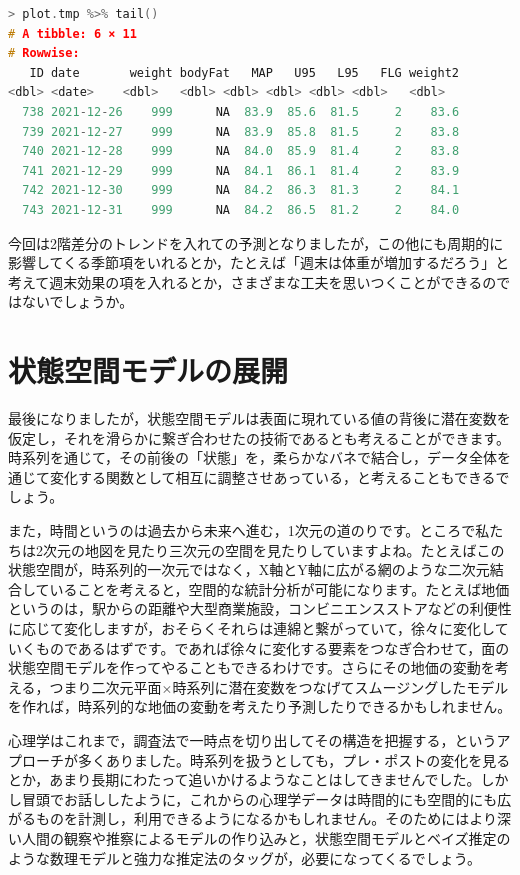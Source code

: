 \documentclass{ltjsbook}
\begin{document}
\begin{lstlisting}[language=c++,label={code:29_06},caption={2階差分トレンドで予想される2021年末の体重(一部略)}]
> plot.tmp %>% tail()
# A tibble: 6 × 11
# Rowwise: 
   ID date       weight bodyFat   MAP   U95   L95   FLG weight2
<dbl> <date>    <dbl>   <dbl> <dbl> <dbl> <dbl> <dbl>   <dbl>
  738 2021-12-26    999      NA  83.9  85.6  81.5     2    83.6
  739 2021-12-27    999      NA  83.9  85.8  81.5     2    83.8
  740 2021-12-28    999      NA  84.0  85.9  81.4     2    83.8
  741 2021-12-29    999      NA  84.1  86.1  81.4     2    83.9
  742 2021-12-30    999      NA  84.2  86.3  81.3     2    84.1
  743 2021-12-31    999      NA  84.2  86.5  81.2     2    84.0
\end{lstlisting}

今回は2階差分のトレンドを入れての予測となりましたが，この他にも周期的に影響してくる季節項をいれるとか，たとえば「週末は体重が増加するだろう」と考えて週末効果の項を入れるとか，さまざまな工夫を思いつくことができるのではないでしょうか。

\section{状態空間モデルの展開}
最後になりましたが，状態空間モデルは表面に現れている値の背後に潜在変数を仮定し，それを滑らかに繋ぎ合わせたの技術であるとも考えることができます。時系列を通じて，その前後の「状態」を，柔らかなバネで結合し，データ全体を通じて変化する関数として相互に調整させあっている，と考えることもできるでしょう。

また，時間というのは過去から未来へ進む，1次元の道のりです。ところで私たちは2次元の地図を見たり三次元の空間を見たりしていますよね。たとえばこの状態空間が，時系列的一次元ではなく，X軸とY軸に広がる網のような二次元結合していることを考えると，空間的な統計分析が可能になります。たとえば地価というのは，駅からの距離や大型商業施設，コンビニエンスストアなどの利便性に応じて変化しますが，おそらくそれらは連綿と繋がっていて，徐々に変化していくものであるはずです。であれば徐々に変化する要素をつなぎ合わせて，面の状態空間モデルを作ってやることもできるわけです。さらにその地価の変動を考える，つまり二次元平面$\times$時系列に潜在変数をつなげてスムージングしたモデルを作れば，時系列的な地価の変動を考えたり予測したりできるかもしれません。

心理学はこれまで，調査法で一時点を切り出してその構造を把握する，というアプローチが多くありました。時系列を扱うとしても，プレ・ポストの変化を見るとか，あまり長期にわたって追いかけるようなことはしてきませんでした。しかし冒頭でお話ししたように，これからの心理学データは時間的にも空間的にも広がるものを計測し，利用できるようになるかもしれません。そのためにはより深い人間の観察や推察によるモデルの作り込みと，状態空間モデルとベイズ推定のような数理モデルと強力な推定法のタッグが，必要になってくるでしょう。
\end{document}
